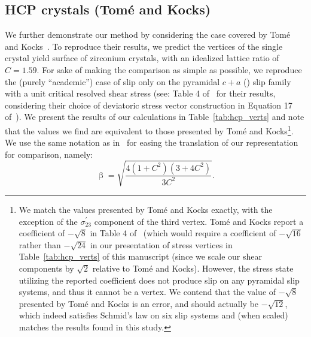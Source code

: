 \documentclass[preprint,3p,times,sort&compress,letterpaper,12pt]{elsarticle} %
\begin{document}
\subsection{HCP crystals (\texorpdfstring{Tom{\'e}}{Tome} and Kocks)}
\label{subsec:hcp_demonstration}

We further demonstrate our method by considering the case covered by Tom{\'e} and Kocks~\cite{Tome1985}. To reproduce their results, we predict the vertices of the single crystal yield surface of zirconium crystals, with an idealized lattice ratio of $C=1.59$. For sake of making the comparison as simple as possible, we reproduce the (purely ``academic'') case of slip only on the pyramidal $c+a$ () slip family with a unit critical resolved shear stress (see: Table 4 of~\cite{Tome1985} for their results, considering their choice of deviatoric stress vector construction in Equation 17 of~\cite{Tome1985}). We present the results of our calculations in Table~\ref{tab:hcp_verts} and note that the values we find are equivalent to those presented by Tom{\'e} and Kocks\footnote{We match the values presented by Tom{\'e} and Kocks exactly, with the exception of the $\sigma^\prime_{23}$ component of the third vertex. Tom{\'e} and Kocks report a coefficient of $-\sqrt{8}$ in Table 4 of~\cite{Tome1985} (which would require a coefficient of $-\sqrt{16}$ rather than $-\sqrt{24}$ in our presentation of stress vertices in Table~\ref{tab:hcp_verts} of this manuscript (since we scale our shear components by $\sqrt{2}$ relative to Tom{\'e} and Kocks). However, the stress state utilizing the reported coefficient does not produce slip on any pyramidal slip systems, and thus it cannot be a vertex. We contend that the value of $-\sqrt{8}$ presented by Tom{\'e} and Kocks is an error, and should actually be $-\sqrt{12}$, which indeed satisfies Schmid's law on six slip systems and (when scaled) matches the results found in this study.}. We use the same notation as in~\cite{Tome1985} for easing the translation of our representation for comparison, namely:
\begin{equation}
    \upbeta = \sqrt{\frac{4\left(1+C^2\right)\left(3+4C^2\right)}{3C^2}}.
\end{equation}
\end{document}
